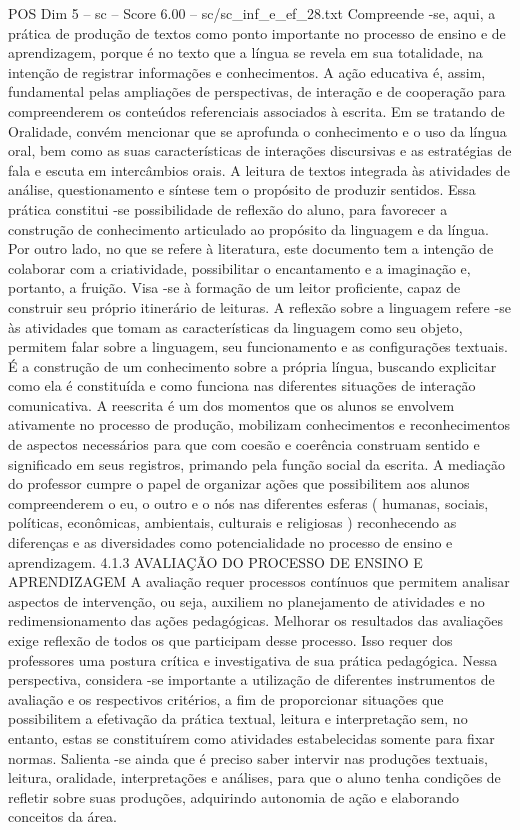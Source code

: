 \begin{textsample}{POS Dim 5 – sc – Score 6.00 – sc/sc\_inf\_e\_ef\_28.txt}
Compreende -se, aqui, a prática de produção de textos como ponto importante no processo de ensino e de aprendizagem, porque é no texto que a língua se revela em sua totalidade, na intenção de registrar informações e conhecimentos.
A ação educativa é, assim, fundamental pelas ampliações de perspectivas, de interação e de cooperação para compreenderem os conteúdos referenciais associados à escrita.
Em se tratando de Oralidade, convém mencionar que se aprofunda o conhecimento e o uso da língua oral, bem como as suas características de interações discursivas e as estratégias de fala e escuta em intercâmbios orais.
A leitura de textos integrada às atividades de análise, questionamento e síntese tem o propósito de produzir sentidos.
Essa prática constitui -se possibilidade de reflexão do aluno, para favorecer a construção de conhecimento articulado ao propósito da linguagem e da língua.
Por outro lado, no que se refere à literatura, este documento tem a intenção de colaborar com a criatividade, possibilitar o encantamento e a imaginação e, portanto, a fruição.
Visa -se à formação de um leitor proficiente, capaz de construir seu próprio itinerário de leituras.
A reflexão sobre a linguagem refere -se às atividades que tomam as características da linguagem como seu objeto, permitem falar sobre a linguagem, seu funcionamento e as configurações textuais.
É a construção de um conhecimento sobre a própria língua, buscando explicitar como ela é constituída e como funciona nas diferentes situações de interação comunicativa.
A reescrita é um dos momentos que os alunos se envolvem ativamente no processo de produção, mobilizam conhecimentos e reconhecimentos de aspectos necessários para que com coesão e coerência construam sentido e significado em seus registros, primando pela função social da escrita.
A mediação do professor cumpre o papel de organizar ações que possibilitem aos alunos compreenderem o eu, o outro e o nós nas diferentes esferas ( humanas, sociais, políticas, econômicas, ambientais, culturais e religiosas ) reconhecendo as diferenças e as diversidades como potencialidade no processo de ensino e aprendizagem. 4.1.3 AVALIAÇÃO DO PROCESSO DE ENSINO E APRENDIZAGEM A avaliação requer processos contínuos que permitem analisar aspectos de intervenção, ou seja, auxiliem no planejamento de atividades e no redimensionamento das ações pedagógicas.
Melhorar os resultados das avaliações exige reflexão de todos os que participam desse processo.
Isso requer dos professores uma postura crítica e investigativa de sua prática pedagógica.
Nessa perspectiva, considera -se importante a utilização de diferentes instrumentos de avaliação e os respectivos critérios, a fim de proporcionar situações que possibilitem a efetivação da prática textual, leitura e interpretação sem, no entanto, estas se constituírem como atividades estabelecidas somente para fixar normas.
Salienta -se ainda que é preciso saber intervir nas produções textuais, leitura, oralidade, interpretações e análises, para que o aluno tenha condições de refletir sobre suas produções, adquirindo autonomia de ação e elaborando conceitos da área.

\end{textsample}
